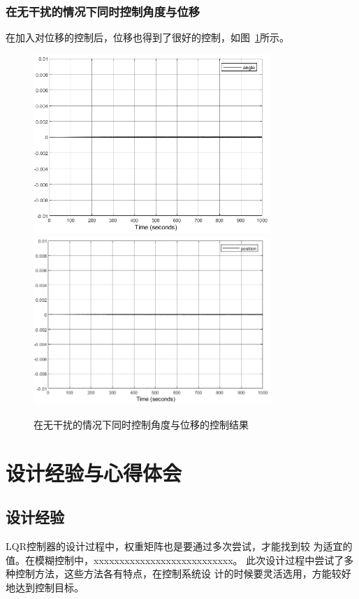 \subsection{在无干扰的情况下同时控制角度与位移}
在加入对位移的控制后，位移也得到了很好的控制，如图~\ref{fig:x}所示。

\begin{figure}[hbpt]
\centering
\includegraphics[width=9cm]{x1.png}
\includegraphics[width=9cm]{x2.png}
\caption{在无干扰的情况下同时控制角度与位移的控制结果}\label{fig:x}
\end{figure}

\chapter{设计经验与心得体会}
\section{设计经验}
LQR控制器的设计过程中，权重矩阵也是要通过多次尝试，才能找到较
为适宜的值。在模糊控制中，xxxxxxxxxxxxxxxxxxxxxxxxxxx。
此次设计过程中尝试了多种控制方法，这些方法各有特点，在控制系统设
计的时候要灵活选用，方能较好地达到控制目标。
